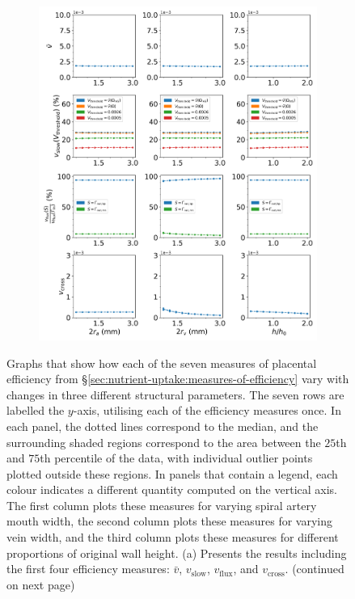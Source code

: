             \begin{figure}
                \vspace{-1.5cm}
                \centering
                \begin{subfigure}{\textwidth}
                    \includegraphics[width=\textwidth]{diagrams/results-variations/mega1_artery_width_vein_width_wall_height_ratio.png}
                    \caption{}
                    \label{fig:mega-other1:1}
                \end{subfigure}
                \caption{Graphs that show how each of the seven measures of placental efficiency from \S\ref{sec:nutrient-uptake:measures-of-efficiency} vary with changes in three different structural parameters. The seven rows are labelled the $y$-axis, utilising each of the efficiency measures once. In each panel, the dotted lines correspond to the median, and the surrounding shaded regions correspond to the area between the $25$th and $75$th percentile of the data, with individual outlier points plotted outside these regions. In panels that contain a legend, each colour indicates a different quantity computed on the vertical axis. The first column plots these measures for varying spiral artery mouth width, the second column plots these measures for varying vein width, and the third column plots these measures for different proportions of original wall height. (a) Presents the results including the first four efficiency measures: $\bar{v}$, $v_\text{slow}$, $v_\text{flux}$, and $v_\text{cross}$. (continued on next page)}
            \end{figure}
